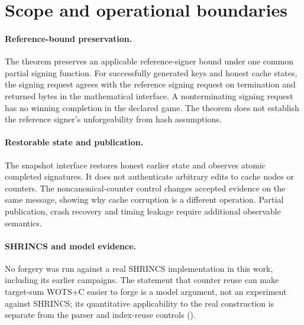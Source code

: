 \documentclass[a4paper,envcountsame,runningheads]{llncs}
\begin{document}

\FloatBarrier


\FloatBarrier

\section{Scope and operational boundaries}\label{sec:limits}
\paragraph{Reference-bound preservation.}
The theorem preserves an applicable reference-signer bound under one common partial signing function. For successfully generated keys and honest cache states, the signing request agrees with the reference signing request on termination and returned bytes in the mathematical interface. A nonterminating signing request has no winning completion in the declared game. The theorem does not establish the reference signer's unforgeability from hash assumptions.

\paragraph{Restorable state and publication.}
The snapshot interface restores honest earlier state and observes atomic completed signatures. It does not authenticate arbitrary edits to cache nodes or counters. The noncanonical-counter control changes accepted evidence on the same message, showing why cache corruption is a different operation. Partial publication, crash recovery and timing leakage require additional observable semantics.

\paragraph{SHRINCS and model evidence.}
No forgery was run against a real SHRINCS implementation in this work, including its earlier campaigns. The statement that counter reuse can make target-sum WOTS+C easier to forge is a model argument, not an experiment against SHRINCS; its quantitative applicability to the real construction is separate from the parser and index-reuse controls ().
\end{document}
